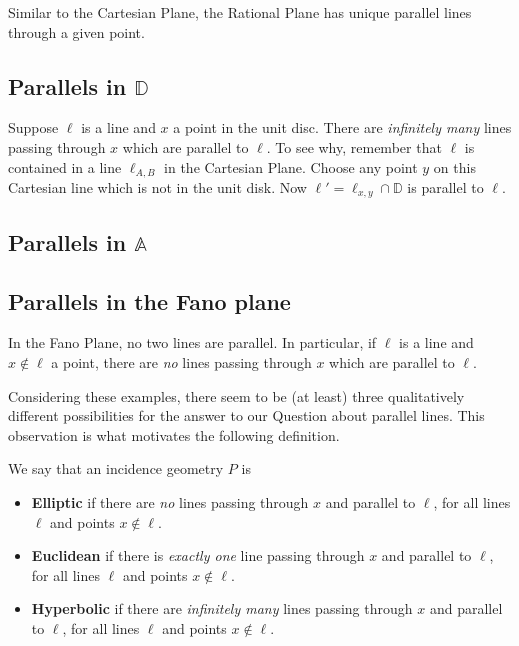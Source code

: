 Similar to the Cartesian Plane, the Rational Plane has unique parallel lines through a given point.



\subsection{Parallels in $\mathbb{D}$}

Suppose $\ell$ is a line and $x$ a point in the unit disc. There are \emph{infinitely many} lines passing through $x$ which are parallel to $\ell$. To see why, remember that $\ell$ is contained in a line $\ell_{A,B}$ in the Cartesian Plane. Choose any point $y$ on this Cartesian line which is not in the unit disk. Now $\ell' = \ell_{x,y} \cap \mathbb{D}$ is parallel to $\ell$.



\subsection{Parallels in $\mathbb{A}$}




\subsection{Parallels in the Fano plane}

In the Fano Plane, no two lines are parallel. In particular, if $\ell$ is a line and $x \notin \ell$ a point, there are \emph{no} lines passing through $x$ which are parallel to $\ell$.



Considering these examples, there seem to be (at least) three qualitatively different possibilities for the answer to our Question about parallel lines. This observation is what motivates the following definition.

\begin{dfn}
We say that an incidence geometry $P$ is
\begin{itemize}
\item \textbf{Elliptic} if there are \emph{no} lines passing through $x$ and parallel to $\ell$, for all lines $\ell$ and points $x \notin \ell$.
\item \textbf{Euclidean} if there is \emph{exactly one} line passing through $x$ and parallel to $\ell$, for all lines $\ell$ and points $x \notin \ell$.
\item \textbf{Hyperbolic} if there are \emph{infinitely many} lines passing through $x$ and parallel to $\ell$, for all lines $\ell$ and points $x \notin \ell$.
\end{itemize}
\end{dfn}

